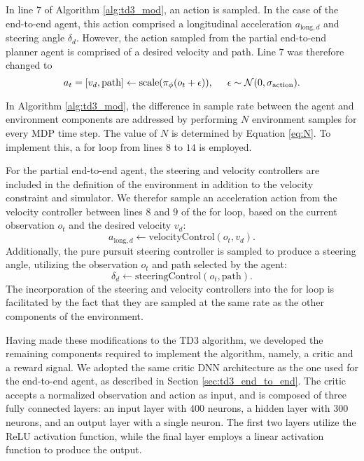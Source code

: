 In line $7$ of Algorithm \ref{alg:td3_mod}, an action is sampled.
In the case of the end-to-end agent, this action comprised a longitudinal acceleration $a_{\text{long},d}$ and steering angle $\delta_d$.
However, the action sampled from the partial end-to-end planner agent is comprised of a desired velocity and path.
Line $7$ was therefore changed to
\begin{equation}\label{eq:pete_agent_sample}
    a_{t} = [v_d, \text{path}] \leftarrow \text{scale}( \pi_{\phi}(o_t+\epsilon) ), \hspace{0.5cm} \epsilon \sim \mathcal{N}(0, \sigma_{\text{action}}).
\end{equation}

In Algorithm \ref{alg:td3_mod}, the difference in sample rate between the agent and environment components are addressed by performing $N$ environment samples for every MDP time step. 
The value of $N$ is determined by Equation \ref{eq:N}. 
To implement this, a for loop from lines $8$ to $14$ is employed.

For the partial end-to-end agent, the steering and velocity controllers are included in the definition of the environment in addition to the velocity constraint and simulator.
We therefor sample an acceleration action from the velocity controller between lines $8$ and $9$ of the for loop, based on  the current observation $o_t$ and the desired velocity $v_d$:
\begin{equation}\label{eq:pete_vel_sample}
    a_{\text{long},d} \leftarrow \text{velocityControl}(o_t, v_d).
\end{equation}
Additionally, the pure pursuit steering controller is sampled to produce a steering angle, utilizing the observation $o_t$ and path selected by the agent:
\begin{equation}\label{eq:pete_steer_sample}
    \delta_d \leftarrow \text{steeringControl}(o_t, \text{path}).
\end{equation}
The incorporation of the steering and velocity controllers into the for loop is facilitated by the fact that they are sampled at the same rate as the other components of the environment.

Having made these modifications to the TD3 algorithm, we developed the remaining components required to implement the algorithm, namely, a critic and a reward signal.
We adopted the same critic DNN architecture as the one used for the end-to-end agent, as described in Section \ref{sec:td3_end_to_end}. 
The critic accepts a normalized observation and action as input, and is composed of three fully connected layers: an input layer with 400 neurons, a hidden layer with 300 neurons, and an output layer with a single neuron. The first two layers utilize the ReLU activation function, while the final layer employs a linear activation function to produce the output. 

